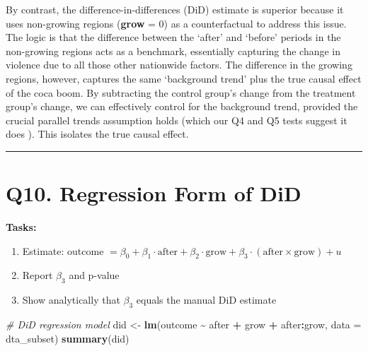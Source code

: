 \documentclass[
]{article}
\newenvironment{Shaded}{\begin{snugshade}}{\end{snugshade}}
\newcommand{\AttributeTok}[1]{\textcolor[rgb]{0.13,0.29,0.53}{#1}}
\newcommand{\CommentTok}[1]{\textcolor[rgb]{0.56,0.35,0.01}{\textit{#1}}}
\newcommand{\FunctionTok}[1]{\textcolor[rgb]{0.13,0.29,0.53}{\textbf{#1}}}
\newcommand{\NormalTok}[1]{#1}
\newcommand{\OtherTok}[1]{\textcolor[rgb]{0.56,0.35,0.01}{#1}}
\newcommand{\SpecialCharTok}[1]{\textcolor[rgb]{0.81,0.36,0.00}{\textbf{#1}}}
\providecommand{\tightlist}{%
  \setlength{\itemsep}{0pt}\setlength{\parskip}{0pt}}
\begin{document}
By contrast, the difference-in-differences (DiD) estimate is superior
because it uses non-growing regions (\textbf{grow} = 0) as a
counterfactual to address this issue. The logic is that the difference
between the `after' and `before' periods in the non-growing regions acts
as a benchmark, essentially capturing the change in violence due to all
those other nationwide factors. The difference in the growing regions,
however, captures the same `background trend' plus the true causal
effect of the coca boom. By subtracting the control group's change from
the treatment group's change, we can effectively control for the
background trend, provided the crucial parallel trends assumption holds
(which our Q4 and Q5 tests suggest it does ). This isolates the true
causal effect.

\begin{center}\rule{0.5\linewidth}{0.5pt}\end{center}

\section{Q10. Regression Form of DiD}\label{q10.-regression-form-of-did}

\textbf{Tasks:}

\begin{enumerate}
\def\labelenumi{\arabic{enumi}.}
\tightlist
\item
  Estimate: outcome
  \(= \beta_0 + \beta_1 \cdot \text{after} + \beta_2 \cdot \text{grow} + \beta_3 \cdot (\text{after} \times \text{grow}) + u\)
\item
  Report \(\beta_3\) and p-value
\item
  Show analytically that \(\beta_3\) equals the manual DiD estimate
\end{enumerate}

\begin{Shaded}
\begin{Highlighting}[]
\CommentTok{\# DiD regression model}
\NormalTok{did }\OtherTok{\textless{}{-}} \FunctionTok{lm}\NormalTok{(outcome }\SpecialCharTok{\textasciitilde{}}\NormalTok{ after }\SpecialCharTok{+}\NormalTok{ grow }\SpecialCharTok{+}\NormalTok{ after}\SpecialCharTok{:}\NormalTok{grow, }\AttributeTok{data =}\NormalTok{ dta\_subset)}
\FunctionTok{summary}\NormalTok{(did)}
\end{Highlighting}
\end{Shaded}
\end{document}
